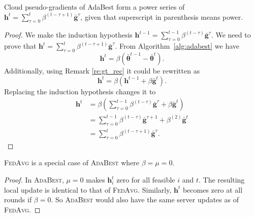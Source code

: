 \documentclass[runningheads]{llncs}
\def\algref#1{Algorithm~\ref{#1}}
\def\vtheta{{\bm{\theta}}}
\def\vg{{\bm{g}}}
\def\vh{{\bm{h}}}
\newcommand*\mean[1]{\bar{#1}}
\newcommand{\fedavg}{\textsc{FedAvg}\xspace}
\newcommand{\ours}{\textsc{AdaBest}\xspace}
\begin{document}
\vspace{0.6cm}
\begin{remark}
Cloud pseudo-gradients of AdaBest form a power series of $\vh^t = \sum_{\tau=0}^{t} \beta^{(t-\tau+1)}\mean{\vg}^{\tau}$, given that superscript in parenthesis means power.
\end{remark}
\begin{proof}
We make the induction hypothesis $\vh^{t-1} = \sum_{\tau=0}^{t-1} \beta^{(t-\tau)}\mean{\vg}^{\tau}$. We need to prove that $\vh^{t} = \sum_{\tau=0}^{t} \beta^{(t-\tau+1)}\mean{\vg}^{\tau}$. 
From \algref{alg:adabest} we have
\begin{equation*}
    \vh^{t} = \beta ( \mean{\vtheta}^{t-1}-\mean{\vtheta}^{t}).
\end{equation*}
Additionally, using Remark \ref{re:gt_rec} it could be rewritten as
\begin{equation*}
    \vh^{t} = \beta ( \vh^{t-1} + \beta \mean{\vg}^{t}).
\end{equation*}
Replacing the induction hypothesis changes it to
\begin{equation*}
\begin{split}
    \vh^{t} &= \beta ( \sum_{\tau=0}^{t-1} \beta^{(t-\tau)}\mean{\vg}^{\tau} + \beta \mean{\vg}^{t}) \\ &= \sum_{\tau=0}^{t-1} \beta^{(t-\tau)}\mean{\vg}^{\tau + 1} + \beta^{(2)} \mean{\vg}^{t} \\ &=\sum_{\tau=0}^{t} \beta^{(t-\tau+1)}\mean{\vg}^{\tau}.
\end{split}
\end{equation*}


\end{proof}


\vspace{0.6cm}

\begin{remark}
\fedavg is a special case of \ours where $\beta=\mu=0$.

\begin{proof}
In \ours, $\mu=0$ makes $\vh_i^t$ zero for all feasible $i$ and $t$. The resulting local update is identical to that of \fedavg. Similarly, $\vh^t$ becomes zero at all rounds if $\beta=0$. So \ours would also have the same server updates as of \fedavg.  
\end{proof}

\vspace{0.6cm}

\end{remark}
\end{document}
